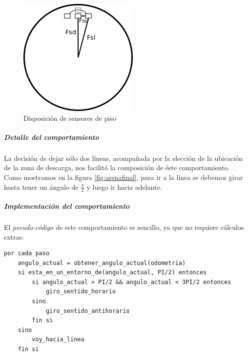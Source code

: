 \begin{figure}[htp]
\begin{center}
\includegraphics[scale=1.0]{comportamientos/figures/floorSensors.png}
\caption{Disposici\'on de sensores de piso}
\label{fig:floorSensors}
\end{center}
\end{figure}

\subparagraph{Detalle del comportamiento}
La decisi\'on de dejar s\'olo dos l\'ineas, acompa\~nada por la elecci\'on de
la ubicaci\'on de la zona de descarga, nos facilit\'o la composici\'on de
\'este comportamiento.
\\\indent Como mostramos en la figura \ref{fig:arenafinal}, para ir a la l\'inea se
debemos girar hasta tener un \'angulo de $\frac{\pi}{2}$ y luego ir hacia
adelante.


\subparagraph{Implementaci\'on del comportamiento}
El \emph{pseudo-c\'odigo} de este comportamiento es sencillo, ya que
no requiere c\'alculos extras:

\begin{verbatim}
por cada paso
    angulo_actual = obtener_angulo_actual(odometria)
    si esta_en_un_entorno_de(angulo_actual, PI/2) entonces
        si angulo_actual > PI/2 && angulo_actual < 3PI/2 entonces
            giro_sentido_horario
        sino
            giro_sentido_antihorario
        fin si
    sino
        voy_hacia_linea
    fin si
\end{verbatim}

